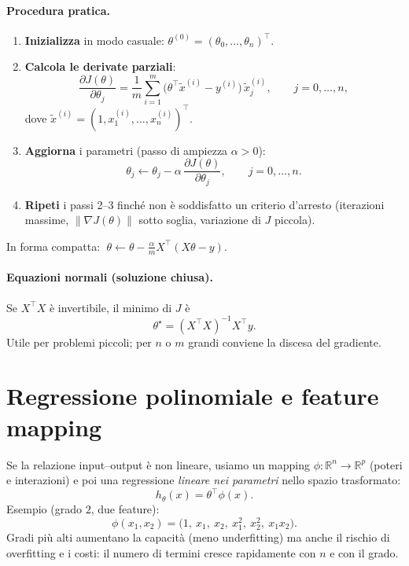 \paragraph{Procedura pratica.}
\begin{enumerate}
  \item \textbf{Inizializza} in modo casuale: \(\theta^{(0)}=(\theta_0,\ldots,\theta_n)^\top\).
  \item \textbf{Calcola le derivate parziali}:
  \[
  \frac{\partial J(\theta)}{\partial \theta_j}
  =\frac{1}{m}\sum_{i=1}^m\big(\theta^\top \tilde x^{(i)}-y^{(i)}\big)\,\tilde x^{(i)}_j,\qquad j=0,\ldots,n,
  \]
  dove \(\tilde x^{(i)}=(1,x^{(i)}_1,\ldots,x^{(i)}_n)^\top\).
  \item \textbf{Aggiorna} i parametri (passo di ampiezza \(\alpha>0\)):
  \[
  \theta_j \leftarrow \theta_j - \alpha\,\frac{\partial J(\theta)}{\partial \theta_j},
  \qquad j=0,\ldots,n.
  \]
  \item \textbf{Ripeti} i passi 2–3 finché non è soddisfatto un criterio d’arresto
  (iterazioni massime, \(\|\nabla J(\theta)\|\) sotto soglia, variazione di \(J\) piccola).
\end{enumerate}
In forma compatta: \(\;\theta \leftarrow \theta - \frac{\alpha}{m}X^\top(X\theta-y)\).

\paragraph{Equazioni normali (soluzione chiusa).}
Se \(X^\top X\) è invertibile, il minimo di \(J\) è
\[
\theta^\star=(X^\top X)^{-1}X^\top y.
\]
Utile per problemi piccoli; per \(n\) o \(m\) grandi conviene la discesa del gradiente.

\section{Regressione polinomiale e feature mapping}
Se la relazione input–output è non lineare, usiamo un mapping
\(\phi:\mathbb{R}^{n}\to\mathbb{R}^{p}\) (poteri e interazioni) e poi una regressione
\emph{lineare nei parametri} nello spazio trasformato:
\[
h_\theta(x)=\theta^\top \phi(x).
\]
Esempio (grado \(2\), due feature):
\[
\phi(x_1,x_2)=\big(1,\ x_1,\ x_2,\ x_1^2,\ x_2^2,\ x_1x_2\big).
\]
Gradi più alti aumentano la capacità (meno underfitting) ma anche il rischio di overfitting
e i costi: il numero di termini cresce rapidamente con \(n\) e con il grado.

